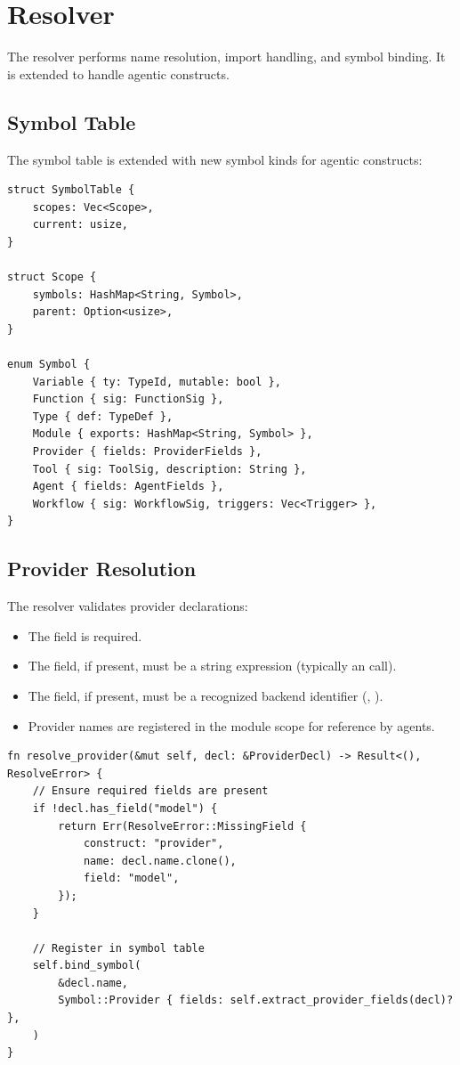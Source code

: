 \section{Resolver}

The resolver performs name resolution, import handling, and symbol binding. It is extended to handle agentic constructs.

\subsection{Symbol Table}

The symbol table is extended with new symbol kinds for agentic constructs:

\begin{lstlisting}[language={}]
struct SymbolTable {
    scopes: Vec<Scope>,
    current: usize,
}

struct Scope {
    symbols: HashMap<String, Symbol>,
    parent: Option<usize>,
}

enum Symbol {
    Variable { ty: TypeId, mutable: bool },
    Function { sig: FunctionSig },
    Type { def: TypeDef },
    Module { exports: HashMap<String, Symbol> },
    Provider { fields: ProviderFields },
    Tool { sig: ToolSig, description: String },
    Agent { fields: AgentFields },
    Workflow { sig: WorkflowSig, triggers: Vec<Trigger> },
}
\end{lstlisting}

\subsection{Provider Resolution}

The resolver validates provider declarations:

\begin{itemize}
    \item The  field is required.
    \item The  field, if present, must be a string expression (typically an  call).
    \item The  field, if present, must be a recognized backend identifier (, ).
    \item Provider names are registered in the module scope for reference by agents.
\end{itemize}

\begin{lstlisting}[language={}]
fn resolve_provider(&mut self, decl: &ProviderDecl) -> Result<(), ResolveError> {
    // Ensure required fields are present
    if !decl.has_field("model") {
        return Err(ResolveError::MissingField {
            construct: "provider",
            name: decl.name.clone(),
            field: "model",
        });
    }

    // Register in symbol table
    self.bind_symbol(
        &decl.name,
        Symbol::Provider { fields: self.extract_provider_fields(decl)? },
    )
}
\end{lstlisting}

